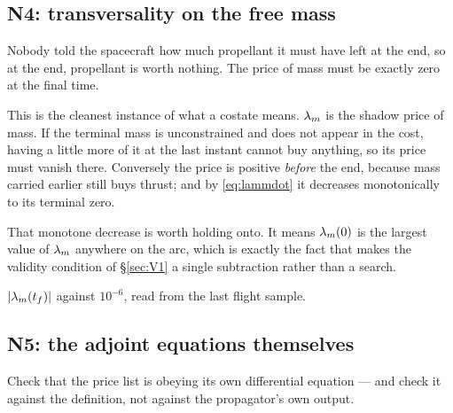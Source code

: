 \documentclass[11pt]{article}
\newcommand{\tf}{t_f}\newcommand{\R}{\mathbb{R}}
\begin{document}
\subsection{N4: transversality on the free mass}\label{sec:N4}

\begin{eli}
Nobody told the spacecraft how much propellant it must have left at the end, so
at the end, propellant is worth nothing. The price of mass must be exactly zero
at the final time.
\end{eli}

\begin{intu}
This is the cleanest instance of what a costate means. $\lambda_m$ is the shadow price
of mass. If the terminal mass is unconstrained and does not appear in the cost,
having a little more of it at the last instant cannot buy anything, so its
price must vanish there. Conversely the price is positive \emph{before} the
end, because mass carried earlier still buys thrust; and by \eqref{eq:lammdot}
it decreases monotonically to its terminal zero.

That monotone decrease is worth holding onto. It means $\lambda_m(0)$ is the largest
value of $\lambda_m$ anywhere on the arc, which is exactly the fact that makes the
validity condition of \S\ref{sec:V1} a single subtraction rather than a search.
\end{intu}

\begin{rig}
$|\lm(\tf)|$ against $10^{-6}$, read from the last flight sample.
\end{rig}

\subsection{N5: the adjoint equations themselves}\label{sec:N5}

\begin{eli}
Check that the price list is obeying its own differential equation --- and check
it against the definition, not against the propagator's own output.
\end{eli}
\end{document}
